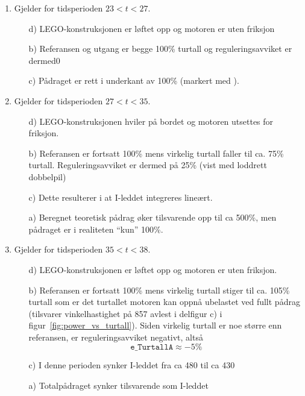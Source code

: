 \begin{enumerate}[1.]
\item Gjelder for tidsperioden $23{<}t{<}27$.
  \begin{itemize}
  \item [d)]   LEGO-konstruksjonen er løftet
    opp og motoren er uten  friksjon
  \item [b)] Referansen og utgang er begge 100\% turtall og
    reguleringsavviket er dermed0
    \item [c)] Pådraget er rett i  underkant av 100\%   (markert med ).
  \end{itemize} 
\item Gjelder for tidsperioden $27{<}t{<}35$.
  \begin{itemize}
  \item [d)]   LEGO-konstruksjonen hviler på
  bordet og motoren utsettes for friksjon. 
  \item [b)]  Referansen er fortsatt 100\% mens virkelig turtall
    faller til ca. 75\% turtall. Reguleringsavviket er dermed på 25\% (vist med
  loddrett dobbelpil)
  \item [c)] Dette resulterer i at I-leddet integreres lineært.
  \item [a)] Beregnet teoretisk pådrag øker tilsvarende opp til  ca
    500\%, men pådraget er i realiteten ``kun'' 100\%.
  \end{itemize}
\item Gjelder for tidsperioden $35{<}t{<}38$.
  \begin{itemize}
  \item [d)]   LEGO-konstruksjonen er løftet
  opp og motoren er uten
  friksjon.
  \item [b)]   Referansen er fortsatt 100\% mens virkelig turtall
  stiger til ca.  105\% turtall som er det turtallet motoren kan oppnå
  ubelastet ved fullt pådrag (tilsvarer vinkelhastighet på 857 avlest
  i  delfigur c) i figur~\ref{fig:power_vs_turtall}).
  Siden virkelig turtall er noe større enn referansen,
  er reguleringsavviket negativt, altså
  \begin{equation}
    \mathtt{e\_{TurtallA}}\approx -5\%
  \end{equation}
\item [c)]   I denne perioden synker I-leddet fra ca 480 til ca 430
\item [a)]  Totalpådraget synker tilsvarende som I-leddet
\end{itemize}


\end{enumerate}
